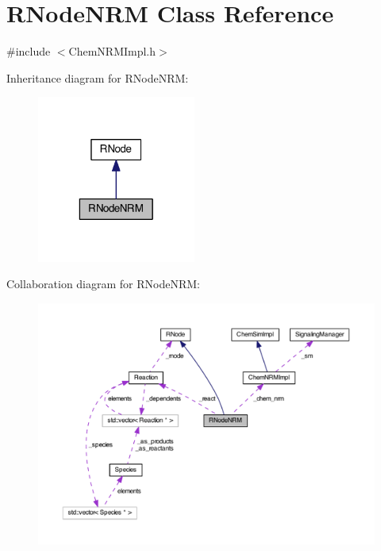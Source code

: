 \hypertarget{classRNodeNRM}{\section{R\-Node\-N\-R\-M Class Reference}
\label{classRNodeNRM}
}


{\ttfamily \#include $<$Chem\-N\-R\-M\-Impl.\-h$>$}



Inheritance diagram for R\-Node\-N\-R\-M\-:\nopagebreak
\begin{figure}[H]
\begin{center}
\leavevmode
\includegraphics[width=148pt]{classRNodeNRM__inherit__graph}
\end{center}
\end{figure}


Collaboration diagram for R\-Node\-N\-R\-M\-:\nopagebreak
\begin{figure}[H]
\begin{center}
\leavevmode
\includegraphics[width=350pt]{classRNodeNRM__coll__graph}
\end{center}
\end{figure}
